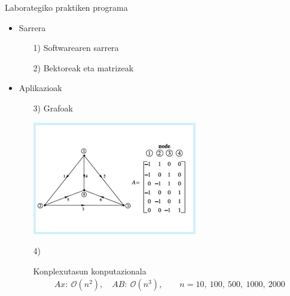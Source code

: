 \documentclass[
 10pt,%
 compress,%
 t,       %
 xcolor=svgnames
]{beamer}
\theoremstyle{definition} \newtheorem{definicion}{Definicion}[section]
\theoremstyle{propiedades} \newtheorem{propiedades}{Propiedades}[section]
\begin{document}
\begin{frame}{Laborategiko praktiken programa}
	
	\small
	\begin{itemize}
		
		\item Sarrera
		\begin{itemize}

		\item[1)] Softwarearen sarrera
		\medskip
		\item[2)] Bektoreak eta matrizeak  %
     	\end{itemize}
		
		\medskip
		
		\item Aplikazioak
		
		\begin{itemize}
		\item[3)] Grafoak \quad 
		\begin{minipage}{.2\textwidth}
			\colorbox{white}  {\includegraphics[width=0.8\linewidth]{IncidentMatrix}}
		\end{minipage}
		
		\item[4)] %
		
		Konplexutasun konputazionala
		\begin{align*}
		Ax:  \ \mathcal{O}(n^2), \quad AB:
		 \ \mathcal{O}(n^3), \qquad n=10, \ 100, \ 500, \ 1000, \ 2000 
		\end{align*}
		

\end{itemize}
\end{itemize}
\end{frame}
\end{document}
